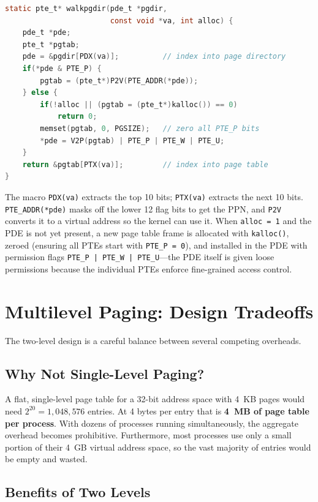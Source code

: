 \documentclass[11pt]{article}
\begin{document}
\begin{lstlisting}[language=C, caption={walkpgdir() in vm.c}]
static pte_t* walkpgdir(pde_t *pgdir,
                        const void *va, int alloc) {
    pde_t *pde;
    pte_t *pgtab;
    pde = &pgdir[PDX(va)];          // index into page directory
    if(*pde & PTE_P) {
        pgtab = (pte_t*)P2V(PTE_ADDR(*pde));
    } else {
        if(!alloc || (pgtab = (pte_t*)kalloc()) == 0)
            return 0;
        memset(pgtab, 0, PGSIZE);   // zero all PTE_P bits
        *pde = V2P(pgtab) | PTE_P | PTE_W | PTE_U;
    }
    return &pgtab[PTX(va)];         // index into page table
}
\end{lstlisting}

The macro \texttt{PDX(va)} extracts the top 10 bits; \texttt{PTX(va)} extracts the next 10 bits. \texttt{PTE\_ADDR(*pde)} masks off the lower 12 flag bits to get the PPN, and \texttt{P2V} converts it to a virtual address so the kernel can use it. When \texttt{alloc = 1} and the PDE is not yet present, a new page table frame is allocated with \texttt{kalloc()}, zeroed (ensuring all PTEs start with \texttt{PTE\_P = 0}), and installed in the PDE with permission flags \texttt{PTE\_P | PTE\_W | PTE\_U}---the PDE itself is given loose permissions because the individual PTEs enforce fine-grained access control.

\section{Multilevel Paging: Design Tradeoffs}

The two-level design is a careful balance between several competing overheads.

\subsection{Why Not Single-Level Paging?}

A flat, single-level page table for a 32-bit address space with 4~KB pages would need $2^{20} = 1{,}048{,}576$ entries. At 4 bytes per entry that is \textbf{4~MB of page table per process}. With dozens of processes running simultaneously, the aggregate overhead becomes prohibitive. Furthermore, most processes use only a small portion of their 4~GB virtual address space, so the vast majority of entries would be empty and wasted.

\subsection{Benefits of Two Levels}
\end{document}
